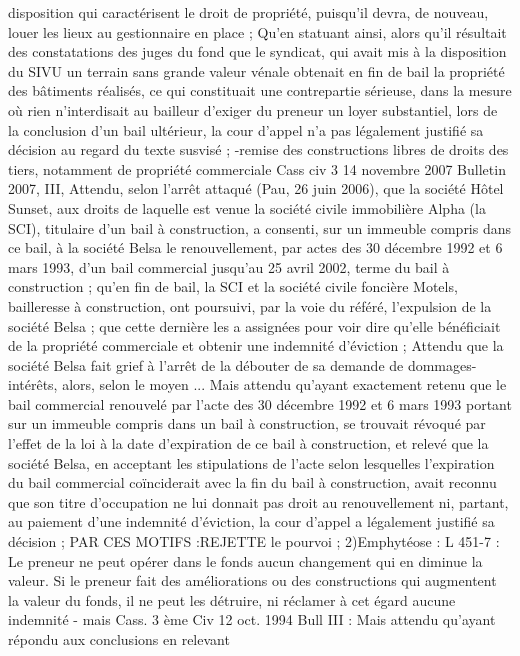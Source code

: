 \documentclass[11pt,a4paper]{report}
\begin{document}
	disposition qui caractérisent le droit de propriété, puisqu'il devra, de nouveau, louer les lieux au gestionnaire en
	place ;
	Qu'en statuant ainsi, alors qu'il résultait des constatations des juges du fond que le syndicat, qui avait mis à la
	disposition du SIVU un terrain sans grande valeur vénale obtenait en fin de bail la propriété des bâtiments
	réalisés, ce qui constituait une contrepartie sérieuse, dans la mesure où rien n'interdisait au bailleur d'exiger du
	preneur un loyer substantiel, lors de la conclusion d'un bail ultérieur, la cour d'appel n'a pas légalement justifié
	sa décision au regard du texte susvisé ;
	-remise des constructions libres de droits des tiers, notamment de propriété commerciale
	Cass civ 3 14 novembre 2007 Bulletin 2007, III, 
	Attendu, selon l'arrêt attaqué (Pau, 26 juin 2006), que la société Hôtel Sunset, aux droits de laquelle est venue la
	société civile immobilière Alpha (la SCI), titulaire d'un bail à construction, a consenti, sur un immeuble compris
	dans ce bail, à la société Belsa le renouvellement, par actes des 30 décembre 1992 et 6 mars 1993, d'un bail
	commercial jusqu'au 25 avril 2002, terme du bail à construction ; qu'en fin de bail, la SCI et la société civile
	foncière Motels, bailleresse à construction, ont poursuivi, par la voie du référé, l'expulsion de la société Belsa ;
	que cette dernière les a assignées pour voir dire qu'elle bénéficiait de la propriété commerciale et obtenir une
	indemnité d'éviction ;
	Attendu que la société Belsa fait grief à l'arrêt de la débouter de sa demande de dommages-intérêts, alors, selon
	le moyen ...
	Mais attendu qu'ayant exactement retenu que le bail commercial renouvelé par l'acte des 30 décembre 1992 et 6
	mars 1993 portant sur un immeuble compris dans un bail à construction, se trouvait révoqué par l'effet de la loi
	à la date d'expiration de ce bail à construction, et relevé que la société Belsa, en acceptant les stipulations de
	l'acte selon lesquelles l'expiration du bail commercial coïnciderait avec la fin du bail à construction, avait
	reconnu que son titre d'occupation ne lui donnait pas droit au renouvellement ni, partant, au paiement d'une
	indemnité d'éviction, la cour d'appel a légalement justifié sa décision ;
	PAR CES MOTIFS :REJETTE le pourvoi ;
	2)Emphytéose : L 451-7 : Le preneur ne peut opérer dans le fonds aucun changement qui en diminue la valeur.
	Si le preneur fait des améliorations ou des constructions qui augmentent la valeur du fonds, il ne peut les
	détruire, ni réclamer à cet égard aucune indemnité
	- mais Cass. 3 ème Civ 12 oct. 1994 Bull III  : Mais attendu qu'ayant répondu aux conclusions en relevant
\end{document}
